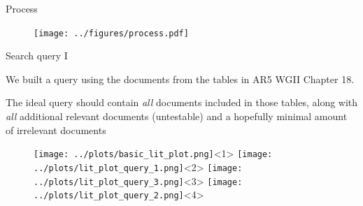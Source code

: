 \documentclass[9pt]{beamer}
\begin{document}
\begin{frame}{Process}
\begin{figure}
	\texttt{[image: ../figures/process.pdf]}
\end{figure}
\end{frame}


\begin{frame}{Search query I}

We built a query using the documents from the tables in AR5 WGII Chapter 18.

The ideal query should contain \textit{all} documents included in those tables, along with \textit{all} additional relevant documents (untestable) and a hopefully minimal amount of irrelevant documents

\begin{figure}
	\texttt{[image: ../plots/basic\_lit\_plot.png]}<1>
	\texttt{[image: ../plots/lit\_plot\_query\_1.png]}<2>
	\texttt{[image: ../plots/lit\_plot\_query\_3.png]}<3>
	\texttt{[image: ../plots/lit\_plot\_query\_2.png]}<4>
\end{figure}
\end{frame}
\end{document}
